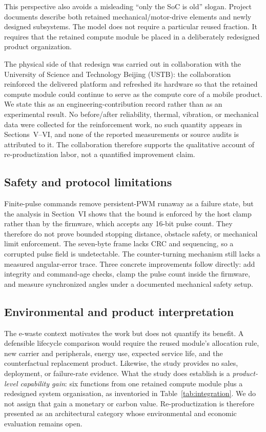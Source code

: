 \documentclass[conference]{IEEEtran}
\begin{document}
This perspective also avoids a misleading ``only the SoC is old'' slogan. Project documents describe both retained mechanical/motor-drive elements and newly designed subsystems. The model does not require a particular reused fraction. It requires that the retained compute module be placed in a deliberately redesigned product organization.

The physical side of that redesign was carried out in collaboration with the University of Science and Technology Beijing (USTB): the collaboration reinforced the delivered platform and refreshed its hardware so that the retained compute module could continue to serve as the compute core of a mobile product. We state this as an engineering-contribution record rather than as an experimental result. No before/after reliability, thermal, vibration, or mechanical data were collected for the reinforcement work, no such quantity appears in Sections~V--VI, and none of the reported measurements or source audits is attributed to it. The collaboration therefore supports the qualitative account of re-productization labor, not a quantified improvement claim.

\subsection{Safety and protocol limitations}
Finite-pulse commands remove persistent-PWM runaway as a failure state, but the analysis in Section~VI shows that the bound is enforced by the host clamp rather than by the firmware, which accepts any 16-bit pulse count. They therefore do not prove bounded stopping distance, obstacle safety, or mechanical limit enforcement. The seven-byte frame lacks CRC and sequencing, so a corrupted pulse field is undetectable. The counter-turning mechanism still lacks a measured angular-error trace. Three concrete improvements follow directly: add integrity and command-age checks, clamp the pulse count inside the firmware, and measure synchronized angles under a documented mechanical safety setup.

\subsection{Environmental and product interpretation}
\label{sec:interpret}
The e-waste context motivates the work but does not quantify its benefit. A defensible lifecycle comparison would require the reused module's allocation rule, new carrier and peripherals, energy use, expected service life, and the counterfactual replacement product. Likewise, the study provides no sales, deployment, or failure-rate evidence. What the study does establish is a \emph{product-level capability gain}: six functions from one retained compute module plus a redesigned system organisation, as inventoried in Table~\ref{tab:integration}. We do not assign that gain a monetary or carbon value. Re-productization is therefore presented as an architectural category whose environmental and economic evaluation remains open.
\end{document}
